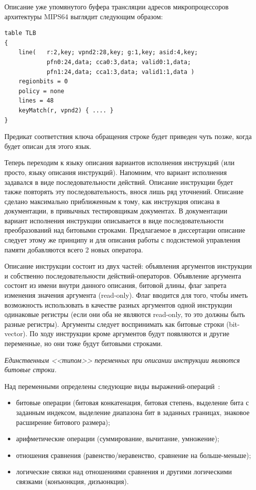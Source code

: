 Описание уже упомянутого буфера трансляции адресов микропроцессоров архитектуры
MIPS64 выглядит следующим образом:
\begin{verbatim}
table TLB
{
    line(   r:2,key; vpnd2:28,key; g:1,key; asid:4,key;
            pfn0:24,data; cca0:3,data; valid0:1,data;
            pfn1:24,data; cca1:3,data; valid1:1,data )
    regionbits = 0
    policy = none
    lines = 48
    keyMatch(r, vpnd2) { .... }
}
\end{verbatim}

Предикат соответствия ключа обращения строке будет приведен чуть позже, когда
будет описан для этого язык.

Теперь переходим к языку описания вариантов исполнения инструкций (или просто,
языку описания инструкций). Напомним, что вариант исполнения задавался в виде
последовательности действий. Описание инструкции будет также повторять эту
последовательность, внося лишь ряд уточнений. Описание сделано максимально
приближенным к тому, как инструкция описана в документации, в привычных
тестировщикам документах. В документации вариант исполнения инструкции
описывается в виде последовательности преобразований над битовыми строками.
Предлагаемое в диссертации описание следует этому же принципу и для описания
работы с подсистемой управления памяти добавляются всего 2 новых оператора.

Описание инструкции состоит из двух частей: объявления аргументов инструкции и
собственно последовательности действий-операторов. Объявление аргумента состоит
из имени внутри данного описания, битовой длины, флаг запрета изменения значения
аргумента (read-only). Флаг вводится для того, чтобы иметь возможность
использовать в качестве разных аргументов одной инструкции одинаковые регистры
(если они оба не являются read-only, то это должны быть разные регистры).
Аргументы следует воспринимать как битовые строки (bit-vector). По ходу
инструкции кроме аргументов будут появляются и другие переменные, но они тоже
будут битовыми строками.

\emph{Единственным <<типом>> переменных при описании инструкции являются битовые
строки.}

Над переменными определены следующие виды выражений-операций~\cite{my_syrcose_2008, my_isp_2008}:
\begin{itemize}
    \item битовые операции (битовая конкатенация, битовая степень, выделение
бита с заданным индексом, выделение диапазона бит в заданных границах, знаковое
расширение битового размера);
    \item арифметические операции (суммирование, вычитание, умножение);
    \item отношения сравнения (равенство/неравенство, сравнение на
больше-меньше);
    \item логические связки над отношениями сравнения и другими логическими
связками (конъюнкция, дизъюнкция).
\end{itemize}

